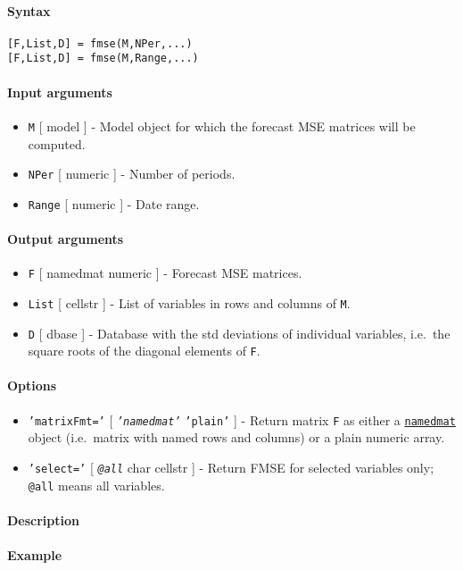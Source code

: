


	\paragraph{Syntax}\label{syntax}

\begin{verbatim}
[F,List,D] = fmse(M,NPer,...)
[F,List,D] = fmse(M,Range,...)
\end{verbatim}

\paragraph{Input arguments}\label{input-arguments}

\begin{itemize}
\item
  \texttt{M} {[} model {]} - Model object for which the forecast MSE
  matrices will be computed.
\item
  \texttt{NPer} {[} numeric {]} - Number of periods.
\item
  \texttt{Range} {[} numeric {]} - Date range.
\end{itemize}

\paragraph{Output arguments}\label{output-arguments}

\begin{itemize}
\item
  \texttt{F} {[} namedmat \textbar{} numeric {]} - Forecast MSE
  matrices.
\item
  \texttt{List} {[} cellstr {]} - List of variables in rows and columns
  of \texttt{M}.
\item
  \texttt{D} {[} dbase {]} - Database with the std deviations of
  individual variables, i.e.~the square roots of the diagonal elements
  of \texttt{F}.
\end{itemize}

\paragraph{Options}\label{options}

\begin{itemize}
\item
  \texttt{'matrixFmt='} {[} \emph{\texttt{'namedmat'}} \textbar{}
  \texttt{'plain'} {]} - Return matrix \texttt{F} as either a
  \href{namedmat/Contents}{\texttt{namedmat}} object (i.e.~matrix with
  named rows and columns) or a plain numeric array.
\item
  \texttt{'select='} {[} \emph{\texttt{@all}} \textbar{} char \textbar{}
  cellstr {]} - Return FMSE for selected variables only; \texttt{@all}
  means all variables.
\end{itemize}

\paragraph{Description}\label{description}

\paragraph{Example}\label{example}



